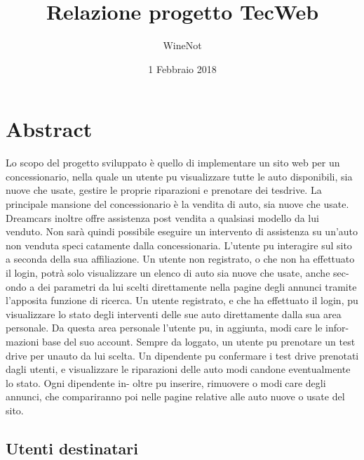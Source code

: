 



\title{\textbf{Relazione progetto TecWeb}}
\author{WineNot}

\date{1 Febbraio 2018}




\makeFrontPage

\tableofcontents

\newpage

\section{Abstract}

Lo scopo del progetto sviluppato è quello di implementare un sito web per un
concessionario, nella quale un utente pu visualizzare tutte le auto disponibili, sia nuove che usate, gestire le proprie riparazioni e prenotare dei tesdrive. La principale mansione del concessionario 
è la vendita di auto, sia nuove che usate. Dreamcars inoltre offre assistenza post vendita a qualsiasi modello da lui
venduto. Non sarà quindi possibile eseguire un intervento di assistenza su un'auto
non venduta specicatamente dalla concessionaria. L'utente pu interagire sul sito
a seconda della sua affiliazione. Un utente non registrato, o che non ha effettuato
il login, potrà solo visualizzare un elenco di auto sia nuove che usate, anche sec-
ondo a dei parametri da lui scelti direttamente nella pagine degli annunci tramite
l'apposita funzione di ricerca. Un utente registrato, e che ha effettuato il login,
pu visualizzare lo stato degli interventi delle sue auto direttamente dalla sua area
personale. Da questa area personale l'utente pu, in aggiunta, modicare le infor-
mazioni base del suo account. Sempre da loggato, un utente pu prenotare un test
drive per unauto da lui scelta.
Un dipendente pu confermare i test drive prenotati dagli utenti, e visualizzare le
riparazioni delle auto modicandone eventualmente lo stato. Ogni dipendente in-
oltre pu inserire, rimuovere o modicare degli annunci, che compariranno poi nelle
pagine relative alle auto nuove o usate del sito.

\subsection{Utenti destinatari}

